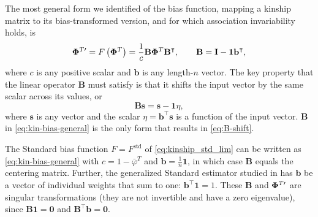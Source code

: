 \documentclass[11pt]{article}
\newcommand{\kinMat}[1][T]{%
  \ensuremath{%
    \mathbf{\Phi}^{#1}
  }%
  \xspace%
}%
\newcommand{\kinMatPrime}{%
  \ensuremath{%
    \mathbf{\Phi}^{T\prime}
  }%
  \xspace%
}%
\begin{document}
\begin{linenumbers}
The most general form we identified of the bias function, mapping a kinship matrix to its bias-transformed version, and for which association invariability holds, is
\begin{equation}
  \label{eq:kin-bias-general}
  \kinMatPrime
  =
  F \left( \kinMat \right)
  =
  \frac{1}{c}
  \mathbf{B} \kinMat \mathbf{B}^\intercal
  , \quad\quad
  \mathbf{B}
  =
  \mathbf{I} - \mathbf{1} \mathbf{b}^\intercal
  ,
\end{equation}
where $c$ is any positive scalar and $\mathbf{b}$ is any length-$n$ vector.
The key property that the linear operator $\mathbf{B}$ must satisfy is that it shifts the input vector by the same scalar across its values, or
\begin{equation}
  \label{eq:B-shift}
  \mathbf{B} \mathbf{s}
  =
  \mathbf{s} - \mathbf{1} \eta
  ,
\end{equation}
where $\mathbf{s}$ is any vector and the scalar $\eta = \mathbf{b}^\intercal \mathbf{s}$ is a function of the input vector.
$\mathbf{B}$ in \cref{eq:kin-bias-general} is the only form that results in \cref{eq:B-shift}.

The Standard bias function $F = F^\text{std}$ of \cref{eq:kinship_std_lim} can be written as \cref{eq:kin-bias-general} with
$c = 1 - \bar{\varphi}^T$ and
$\mathbf{b} = \frac{1}{n} \mathbf{1}$, in which case $\mathbf{B}$ equals the centering matrix.
Further, the generalized Standard estimator studied in \citet{ochoa_estimating_2021} has $\mathbf{b}$ be a vector of individual weights that sum to one: $\mathbf{b}^\intercal \mathbf{1} = 1$.
These $\mathbf{B}$ and $\kinMatPrime$ are singular transformations (they are not invertible and have a zero eigenvalue), since $\mathbf{B} \mathbf{1} = \mathbf{0}$ and $\mathbf{B}^\intercal \mathbf{b} = \mathbf{0}$.


\end{linenumbers}
\end{document}
